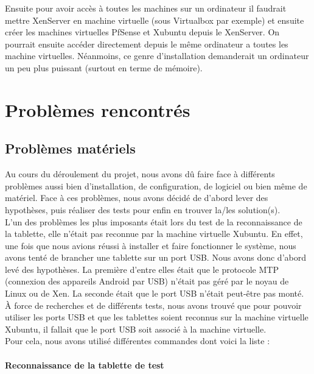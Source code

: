 \documentclass[a4paper,12pt]{extarticle}
\begin{document}
Ensuite pour avoir accès à toutes les machines sur un ordinateur il faudrait mettre XenServer en machine virtuelle (sous Virtualbox par exemple) et ensuite créer les machines virtuelles PfSense et Xubuntu depuis le XenServer. On pourrait ensuite accéder directement depuis le même ordinateur a toutes les machine virtuelles. Néanmoins, ce genre d’installation demanderait un ordinateur un peu plus puissant (surtout en terme de mémoire).


\clearpage
\section{Problèmes rencontrés}

\subsection{Problèmes matériels}

Au cours du déroulement du projet, nous avons dû faire face à différents problèmes aussi bien d’installation, de configuration, de logiciel ou bien même de matériel. Face à ces problèmes, nous avons décidé de d’abord lever des hypothèses, puis réaliser des tests pour enfin en trouver la/les solution(s).\\

L’un des problèmes les plus imposants était lors du test de la reconnaissance de la tablette, elle n’était pas reconnue par la machine virtuelle Xubuntu. En effet, une fois que nous avions réussi à installer et faire fonctionner le système, nous avons tenté de brancher une tablette sur un port USB.\newline
Nous avons donc d’abord levé des hypothèses. La première d’entre elles était que le protocole MTP (connexion des appareils Android par USB) n’était pas géré par le noyau de Linux ou de Xen. La seconde était que le port USB n’était peut-être pas monté.
À force de recherches et de différents tests, nous avons trouvé que pour pouvoir utiliser les ports USB et que les tablettes soient reconnus sur la machine virtuelle Xubuntu, il fallait que le port USB soit associé à la machine virtuelle.\\


Pour cela, nous avons utilisé différentes commandes dont voici la liste :\\

\paragraph{Reconnaissance de la tablette de test\\}
\end{document}
